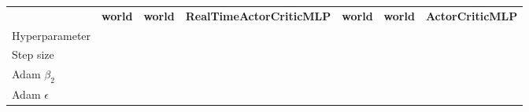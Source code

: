 \begin{tabular}{lllllll}
 & \bfseries world & \bfseries world & \bfseries RealTimeActorCriticMLP & \bfseries world & \bfseries world & \bfseries ActorCriticMLP \\
Hyperparameter &  &  &  &  &  &  \\
Step size &  &  &  &  &  &  \\
Adam $\beta_2$ &  &  &  &  &  &  \\
Adam $\epsilon$ &  &  &  &  &  &  \\
\end{tabular}
